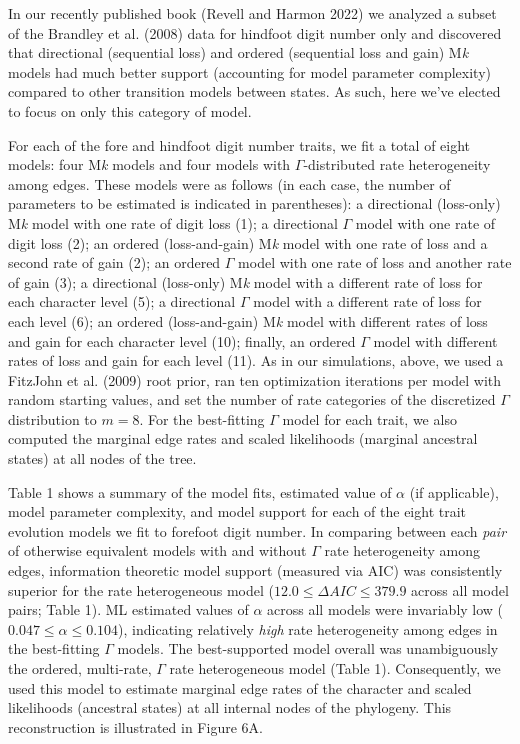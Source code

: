\documentclass[fleqn,10pt,lineno]{wlpeerj} %
\begin{document}
In our recently published book (Revell and Harmon 2022) we analyzed a subset of the Brandley et al. (2008) data for hindfoot digit number only and discovered that directional (sequential loss) and ordered (sequential loss and gain) M\emph{k} models had much better support (accounting for model parameter complexity) compared to other transition models between states. As such, here we've elected to focus on only this category of model.

For each of the fore and hindfoot digit number traits, we fit a total of eight models: four M\emph{k} models and four models with \(\Gamma\)-distributed rate heterogeneity among edges. These models were as follows (in each case, the number of parameters to be estimated is indicated in parentheses): a directional (loss-only) M\emph{k} model with one rate of digit loss (1); a directional \(\Gamma\) model with one rate of digit loss (2); an ordered (loss-and-gain) M\emph{k} model with one rate of loss and a second rate of gain (2); an ordered \(\Gamma\) model with one rate of loss and another rate of gain (3); a directional (loss-only) M\emph{k} model with a different rate of loss for each character level (5); a directional \(\Gamma\) model with a different rate of loss for each level (6); an ordered (loss-and-gain) M\emph{k} model with different rates of loss and gain for each character level (10); finally, an ordered \(\Gamma\) model with different rates of loss and gain for each level (11). As in our simulations, above, we used a FitzJohn et al. (2009) root prior, ran ten optimization iterations per model with random starting values, and set the number of rate categories of the discretized \(\Gamma\) distribution to \(m = 8\). For the best-fitting \(\Gamma\) model for each trait, we also computed the marginal edge rates and scaled likelihoods (marginal ancestral states) at all nodes of the tree.

Table 1 shows a summary of the model fits, estimated value of \(\alpha\) (if applicable), model parameter complexity, and model support for each of the eight trait evolution models we fit to forefoot digit number. In comparing between each \emph{pair} of otherwise equivalent models with and without \(\Gamma\) rate heterogeneity among edges, information theoretic model support (measured via AIC) was consistently superior for the rate heterogeneous model (\(12.0 \le \Delta AIC \le 379.9\) across all model pairs; Table 1). ML estimated values of \(\alpha\) across all models were invariably low (\(0.047 \le \alpha \le 0.104\)), indicating relatively \emph{high} rate heterogeneity among edges in the best-fitting \(\Gamma\) models. The best-supported model overall was unambiguously the ordered, multi-rate, \(\Gamma\) rate heterogeneous model (Table 1). Consequently, we used this model to estimate marginal edge rates of the character and scaled likelihoods (ancestral states) at all internal nodes of the phylogeny. This reconstruction is illustrated in Figure 6A.
\end{document}
